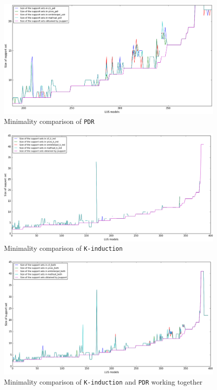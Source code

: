 \begin{figure}
  \centering
  \includegraphics[width=\textwidth]{figs/minimality_pdr.png}
  \caption{\small{Minimality comparison of \texttt{PDR}}}\label{fig:minpdr}
\end{figure}


\begin{figure}
  \centering
  \includegraphics[width=\textwidth]{figs/minimality_kind.png}
  \caption{\small{Minimality comparison of \texttt{K-induction}}}\label{fig:minkind}
\end{figure}


\begin{figure}
  \centering
  \includegraphics[width=\textwidth]{figs/minimality_both.png}
  \caption{\small{Minimality comparison of \texttt{K-induction} and \texttt{PDR} working together}}\label{fig:minboth}
\end{figure}


